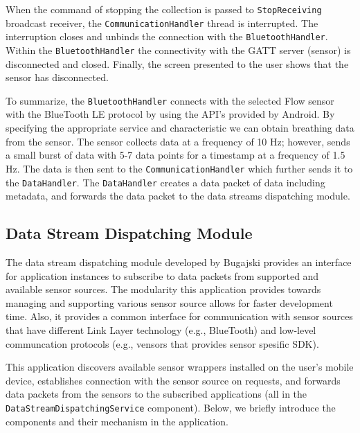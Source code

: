 When the command of stopping the collection is passed to \verb|StopReceiving| broadcast receiver, the \verb|CommunicationHandler| thread is interrupted. The interruption closes and unbinds the connection with the \verb|BluetoothHandler|. Within the \verb|BluetoothHandler| the connectivity with the GATT server (sensor) is disconnected and closed. Finally, the screen presented to the user shows that the sensor has disconnected.

To summarize, the \verb|BluetoothHandler| connects with the selected Flow sensor with the BlueTooth LE protocol by using the API's provided by Android. By specifying the appropriate service and characteristic we can obtain breathing data from the sensor. The sensor collects data at a frequency of 10 Hz; however, sends a small burst of data with 5-7 data points for a timestamp at a frequency of 1.5 Hz. The data is then sent to the \verb|CommunicationHandler| which further sends it to the \verb|DataHandler|. The \verb|DataHandler| creates a data packet of data including metadata, and forwards the data packet to the data streams dispatching module.  


\subsection{Data Stream Dispatching Module}\label{imp:dsdm}
The data stream dispatching module developed by Bugajski provides an interface for application instances to subscribe to data packets from supported and available sensor sources. The modularity this application provides towards managing and supporting various sensor source allows for faster development time. Also, it provides a common interface for communication with sensor sources that have different Link Layer technology (e.g., BlueTooth) and low-level communcation protocols (e.g., vensors that provides sensor spesific SDK). 

This application discovers available sensor wrappers installed on the user's mobile device, establishes connection with the sensor source on requests, and forwards data packets from the sensors to the subscribed applications (all in the \verb|DataStreamDispatchingService| component). Below, we briefly introduce the components and their mechanism in the application.

